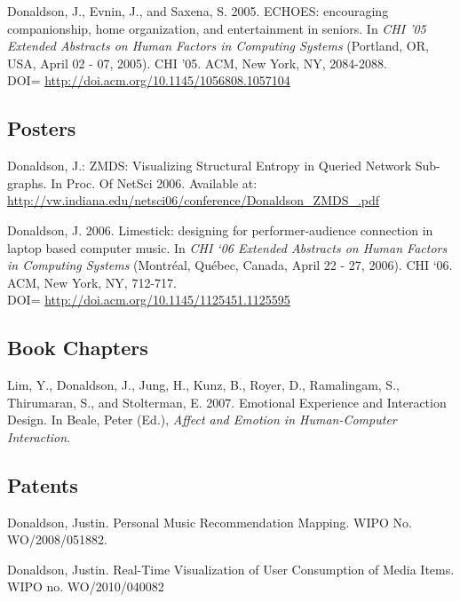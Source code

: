\documentclass[overlapped,line,letterpaper]{res}
\begin{document}
\begin{resume}
Donaldson, J., Evnin, J., and Saxena, S. 2005. ECHOES: encouraging companionship, home organization, and entertainment in seniors. In \emph{CHI '05 Extended Abstracts on Human Factors in Computing Systems} (Portland, OR, USA, April 02 - 07, 2005). CHI '05. ACM, New York, NY, 2084-2088. \\DOI= \url{http://doi.acm.org/10.1145/1056808.1057104}



\subsection{\bf Posters}
Donaldson, J.: ZMDS: Visualizing Structural Entropy in Queried Network Sub-graphs.   In Proc. Of NetSci 2006. Available at: \url{http://vw.indiana.edu/netsci06/conference/Donaldson_ZMDS_.pdf}

Donaldson, J. 2006. Limestick: designing for performer-audience connection in laptop based computer music. In \emph{CHI `06 Extended Abstracts on Human Factors in Computing Systems} (Montr\'eal, Qu\'ebec, Canada, April 22 - 27, 2006). CHI `06. ACM, New York, NY, 712-717. \\ DOI= \url{http://doi.acm.org/10.1145/1125451.1125595} 



\subsection{\bf Book Chapters}
Lim, Y., Donaldson, J., Jung, H., Kunz, B., Royer, D., Ramalingam, S., Thirumaran, S., and Stolterman, E. 2007. Emotional Experience and Interaction Design. In Beale, Peter (Ed.), \emph{Affect and Emotion in Human-Computer Interaction}.

\subsection{\bf Patents}
Donaldson, Justin. Personal Music Recommendation Mapping. WIPO No. WO/2008/051882. 	 

Donaldson, Justin. Real-Time Visualization of User Consumption of Media Items. WIPO no. WO/2010/040082

% 


\end{resume}
\end{document}
